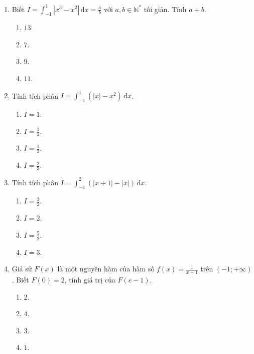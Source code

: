 \documentclass[12pt]{article}
\begin{document}
\begin{enumerate}[label=\textbf{Câu \arabic*.}]
		\item Biết $I = \displaystyle \int_{-1}^{1} |x^3 - x^2|\,\mathrm{d}x = \frac{a}{b}$ với $a, b \in \mathbb{N}^*$ tối giản. Tính $a + b$.
		\begin{multicols}{4}
			\begin{enumerate}[label=\textbf{\Alph*.}]
				\item $13$.
				\item $7$.
				\item $9$.
				\item $11$.
			\end{enumerate}
		\end{multicols}
		
		\item Tính tích phân $I = \displaystyle \int_{-1}^{1} (|x| - x^2)\,\mathrm{d}x$.
		\begin{multicols}{4}
			\begin{enumerate}[label=\textbf{\Alph*.}]
				\item $I = 1$.
				\item $I = \frac{1}{2}$.
				\item $I = \frac{1}{3}$.
				\item $I = \frac{2}{3}$.
			\end{enumerate}
		\end{multicols}
		
		\item Tính tích phân $I = \displaystyle \int_{-1}^{2} (|x + 1| - |x|)\,\mathrm{d}x$.
		\begin{multicols}{4}
			\begin{enumerate}[label=\textbf{\Alph*.}]
				\item $I = \frac{3}{2}$.
				\item $I = 2$.
				\item $I = \frac{5}{2}$.
				\item $I = 3$.
			\end{enumerate}
		\end{multicols}
		
		\item Giả sử $F(x)$ là một nguyên hàm của hàm số $f(x) = \frac{1}{x+1}$ trên $(-1; +\infty)$. Biết $F(0) = 2$, tính giá trị của $F(e - 1)$.
		\begin{multicols}{4}
			\begin{enumerate}[label=\textbf{\Alph*.}]
				\item $2$.
				\item $4$.
				\item $3$.
				\item $1$.
			\end{enumerate}
		\end{multicols}
		

\end{enumerate}
\end{document}
